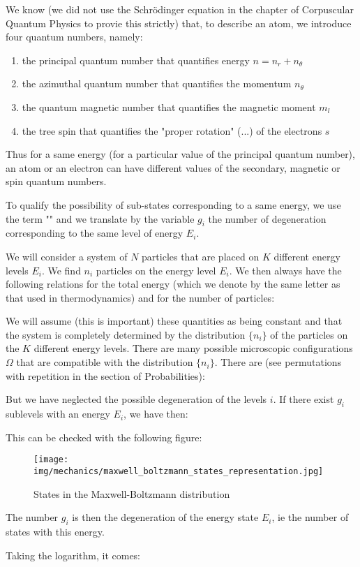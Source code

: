 	We know (we did not use the Schrödinger equation in the chapter of Corpuscular Quantum Physics to provie this strictly) that, to describe an atom, we introduce four quantum numbers, namely:
	\begin{enumerate}
		\item the principal quantum number that quantifies energy $n=n_r+n_\theta$

		\item the azimuthal quantum number that quantifies the momentum $n_\theta$

		\item the quantum magnetic  number that quantifies the magnetic moment $m_l$

		\item the tree spin that quantifies the "proper rotation" (...) of the electrons $s$
	\end{enumerate}
	Thus for a same energy (for a particular value of the principal quantum number), an atom or an electron can have different values of the secondary, magnetic or spin quantum numbers.

	To qualify the possibility  of sub-states corresponding to a same energy, we use the term "" and we translate by the variable $g_i$ the number of degeneration corresponding to the same level of energy $E_i$.

	We will consider a system of $N$ particles that are placed on $K$ different energy levels $E_i$. We find $n_i$ particles on the energy level $E_i$. We then always have the following relations for the total energy (which we denote by the same letter as that used in thermodynamics) and for the number of particles:
	
	We will assume (this is important) these quantities as being constant and that the system is completely determined by the distribution $\{n_i\}$  of the particles on the $K$ different energy levels.
	There are many possible microscopic configurations $\Omega$ that are compatible with the distribution $\{n_i\}$. There are (see permutations with repetition in the section of Probabilities):
	
	But we have neglected the possible degeneration of the levels $i$. If there exist $g_i$ sublevels with an energy $E_i$, we have then:
	
	This can be checked with the following figure:
	\begin{figure}[H]
		\centering
		\texttt{[image: img/mechanics/maxwell\_boltzmann\_states\_representation.jpg]}
		\caption{States in the Maxwell-Boltzmann distribution}
	\end{figure}
	\begin{tcolorbox}[title=Remark,colframe=black,arc=10pt]
	The number $g_i$ is then the degeneration of the energy state $E_i$, ie the number of states with this energy.
	\end{tcolorbox}
	Taking the logarithm, it comes:
	
